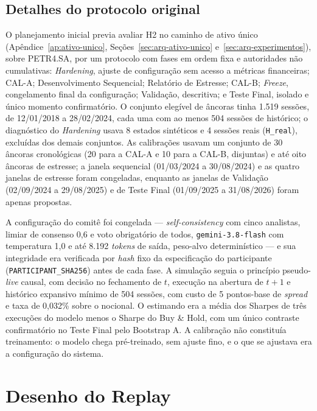 \subsection{Detalhes do protocolo original}
\label{sec:met-protocolo-detalhes}

O planejamento inicial previa avaliar H2 no caminho de ativo único (Apêndice~\ref{ap:ativo-unico}, Seções~\ref{sec:arq-ativo-unico} e~\ref{sec:arq-experimentos}), sobre PETR4.SA, por um protocolo com fases em ordem fixa e autoridades não cumulativas: \textit{Hardening}, ajuste de configuração sem acesso a métricas financeiras; CAL-A; Desenvolvimento Sequencial; Relatório de Estresse; CAL-B; \textit{Freeze}, congelamento final da configuração; Validação, descritiva; e Teste Final, isolado e único momento confirmatório. O conjunto elegível de âncoras tinha 1.519 sessões, de 12/01/2018 a 28/02/2024, cada uma com ao menos 504 sessões de histórico; o diagnóstico do \textit{Hardening} usava 8 estados sintéticos e 4 sessões reais (\texttt{H\_real}), excluídas dos demais conjuntos. As calibrações usavam um conjunto de 30 âncoras cronológicas (20 para a CAL-A e 10 para a CAL-B, disjuntas) e até oito âncoras de estresse; a janela sequencial (01/03/2024 a 30/08/2024) e as quatro janelas de estresse foram congeladas, enquanto as janelas de Validação (02/09/2024 a 29/08/2025) e de Teste Final (01/09/2025 a 31/08/2026) foram apenas propostas.

A configuração do comitê foi congelada --- \textit{self-consistency} com cinco analistas, limiar de consenso 0,6 e voto obrigatório de todos, \texttt{gemini-3.8-flash} com temperatura 1,0 e até 8.192 \textit{tokens} de saída, peso-alvo determinístico --- e sua integridade era verificada por \textit{hash} fixo da especificação do participante (\texttt{PARTICIPANT\_SHA256}) antes de cada fase. A simulação seguia o princípio pseudo-\textit{live} causal, com decisão no fechamento de $t$, execução na abertura de $t+1$ e histórico expansivo mínimo de 504 sessões, com custo de 5 pontos-base de \textit{spread} e taxa de 0,032\% sobre o nocional. O estimando era a média dos Sharpes de três execuções do modelo menos o Sharpe do Buy \& Hold, com um único contraste confirmatório no Teste Final pelo Bootstrap A. A calibração não constituía treinamento: o modelo chega pré-treinado, sem ajuste fino, e o que se ajustava era a configuração do sistema.

\section{Desenho do Replay}
\label{sec:met-desenho}

